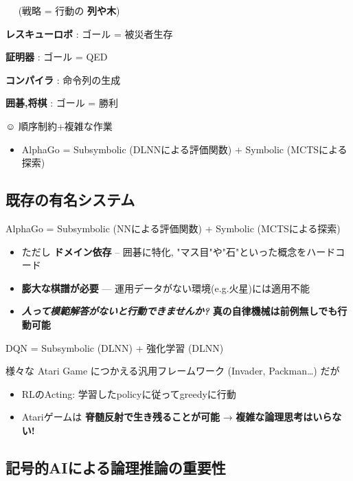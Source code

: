 \begin{container-fluid}
\begin{row-fluid}
\begin{span6}
\begin{itemize}
　 (戦略 = 行動の \textbf{列や木})
\begin{smaller}
\textbf{レスキューロボ} : ゴール = 被災者生存

\textbf{証明器} : ゴール = QED

\textbf{コンパイラ} : 命令列の生成

\textbf{囲碁,将棋} : ゴール = 勝利
\end{smaller}
\begin{larger}
☺ 順序制約+複雑な作業
\end{larger}
\end{itemize}
\end{span6}
\end{row-fluid}
\end{container-fluid}

\begin{itemize}
\item AlphaGo = Subsymbolic (DLNNによる評価関数) + Symbolic (MCTSによる探索)
\end{itemize}

\subsection{既存の有名システム}
\label{sec-2-2}

AlphaGo = Subsymbolic (NNによる評価関数) + Symbolic (MCTSによる探索)
\begin{itemize}
\item ただし \textbf{ドメイン依存} -- 囲碁に特化, "マス目"や"石"といった概念をハードコード
\item \textbf{膨大な棋譜が必要} --- 運用データがない環境(e.g.火星)には適用不能
\item \textbf{\emph{人って模範解答がないと行動できませんか?}} \textbf{真の自律機械は前例無しでも行動可能}
\end{itemize}

DQN = Subsymbolic (DLNN) + 強化学習 (DLNN)

様々な Atari Game につかえる汎用フレームワーク (Invader, Packman…) だが
\begin{itemize}
\item RLのActing: 学習したpolicyに従ってgreedyに行動
\item Atariゲームは \textbf{脊髄反射で生き残ることが可能} → \textbf{複雑な論理思考はいらない!}
\end{itemize}

\subsection{記号的AIによる論理推論の重要性}
\label{sec-2-3}

